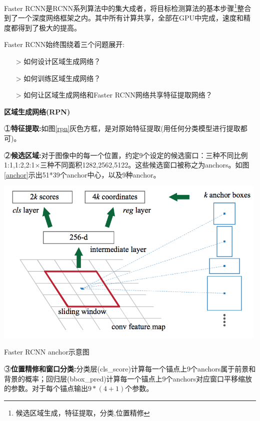 Faster RCNN是RCNN系列算法中的集大成者，将目标检测算法的基本步骤\footnote{候选区域生成，特征提取，分类,位置精修}整合到了一个深度网络框架之内。其中所有计算共享，全部在GPU中完成，速度和精度都得到了极大的提高。

Faster RCNN始终围绕着三个问题展开:

\line
\begin{itemize}
	\setlength{\itemsep}{0pt}
	\setlength{\parsep}{0pt}
	\setlength{\parskip}{0pt}
	\item[>] 如何设计区域生成网络？
	\item[>] 如何训练区域生成网络？
	\item[>] 如何让区域生成网络和Faster RCNN网络共享特征提取网络？
\end{itemize}
\line

\textbf{区域生成网络(RPN)}

\textcircled{１}\textbf{特征提取:}如图\ref{rpn}灰色方框，是对原始特征提取(用任何分类模型进行提取都可)。

\textcircled{２}\textbf{候选区域:}对于图像中的每一个位置，约定9个设定的候选窗口：三种不同比例{1:1,1:2,2:1}×三种不同面积{1282,2562,5122}。这些候选窗口被称之为anchors。如图\ref{anchor}示出51*39个anchor中心，以及9种anchor。
 
\begin{uscfigure}
	\includegraphics[width=\textwidth,height=8cm]{./Pictures/faster_rcnn_anchor.png}	
	\caption{Faster RCNN anchor示意图}	
	\label{anchor}
\end{uscfigure}

\textcircled{３}\textbf{位置精修和窗口分类:}分类层(cls\_score)计算每一个锚点上9个anchors属于前景和背景的概率；回归层(bbox\_pred)计算每一个锚点上9个anchors对应窗口平移缩放的参数。对于每个锚点输出$9*(4+1)$个参数。




